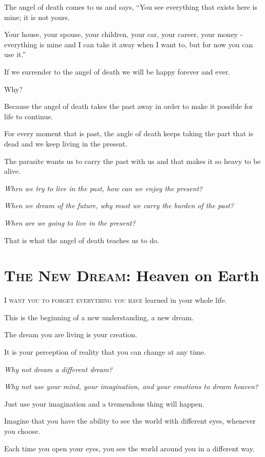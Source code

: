 \documentclass{article}
\numberwithin{equation}{section}
\begin{document}
The angel of death comes to us and says, ``You see everything that exists here is mine; it is not yours.

Your house, your spouse, your children, your car, your career, your money - everything is mine and I can take it away when I want to, but for now you can use it.''

%
If we surrender to the angel of death we will be happy forever and ever.

Why?

Because the angel of death takes the past away in order to make it possible for life to continue.

For every moment that is past, the angle of death keeps taking the part that is dead and we keep living in the present.

The parasite wants us to carry the past with us and that makes it so heavy to be alive.

\textit{When we try to live in the past, how can we enjoy the present?}

\textit{When we dream of the future, why must we carry the burden of the past?}

\textit{When are we going to live in the present?}

That is what the angel of death teaches us to do.

\section{\textsc{The New Dream}: Heaven on Earth}
\textsc{I want you to forget everything you have} learned in your whole life.

This is the beginning of a new understanding, a new dream.

%
The dream you are living is your creation.

It is your perception of reality that you can change at any time.


\textit{Why not dream a different dream?}

\textit{Why not use your mind, your imagination, and your emotions to dream heaven?}

%
Just use your imagination and a tremendous thing will happen.

Imagine that you have the ability to see the world with different eyes, whenever you choose.

Each time you open your eyes, you see the world around you in a different way.
\end{document}
